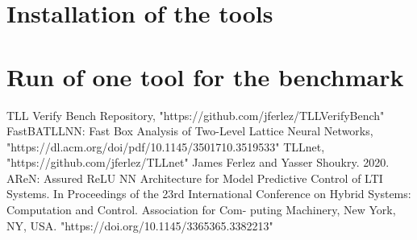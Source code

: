 \documentclass[12pt,a4paper]{report}
\theoremstyle{definition}
\theoremstyle{remark}
\begin{document}
\chapter{Installation of the tools}
\chapter{Run of one tool for the benchmark}
\begin{thebibliography}{1}
 TLL Verify Bench Repository, "https://github.com/jferlez/TLLVerifyBench"
 FastBATLLNN: Fast Box Analysis of Two-Level Lattice Neural Networks, "https://dl.acm.org/doi/pdf/10.1145/3501710.3519533"
 TLLnet, "https://github.com/jferlez/TLLnet"
 James Ferlez and Yasser Shoukry. 2020. AReN: Assured ReLU NN Architecture for
Model Predictive Control of LTI Systems. In Proceedings of the 23rd International
Conference on Hybrid Systems: Computation and Control. Association for Com-
puting Machinery, New York, NY, USA. "https://doi.org/10.1145/3365365.3382213"
\end{thebibliography}
\end{document}
